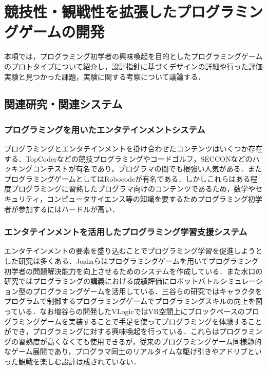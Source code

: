 \section{競技性・観戦性を拡張したプログラミングゲームの開発}
本項では，プログラミング初学者の興味喚起を目的としたプログラミングゲームのプロトタイプについて紹介し，設計指針に基づくデザインの詳細や行った評価実験と見つかった課題，実験に関する考察について議論する．

\subsection{関連研究・関連システム}

\subsubsection{プログラミングを用いたエンタテインメントシステム}
プログラミングとエンタテインメントを掛け合わせたコンテンツはいくつか存在する．TopCoder\cite{topcoder}などの競技プログラミングやコードゴルフ\cite{codegolf}，SECCON\cite{seccon}などのハッキングコンテストが有名であり，プログラマの間でも根強い人気がある．またプログラミングゲームとしてはRobocode\cite{robocode}が有名である．しかしこれらはある程度プログラミングに習熟したプログラマ向けのコンテンツであるため，数学やセキュリティ，コンピュータサイエンス等の知識を要するためプログラミング初学者が参加するにはハードルが高い．

\subsubsection{エンタテインメントを活用したプログラミング学習支援システム}
エンタテインメントの要素を盛り込むことでプログラミング学習を促進しようとした研究は多くある．Joshaらはプログラミングゲームを用いてプログラミング初学者の問題解決能力を向上させるためのシステムを作成している\cite{joshua}．また水口の研究ではプログラミングの講義における成績評価にロボットバトルシミュレーション型のプログラミングゲームを活用している\cite{minakuchi}．三谷らの研究ではキャラクタをプログラムで制御するプログラミングゲームでプログラミングスキルの向上を図っている\cite{mitani}．なお増谷らの開発したVLogic\cite{mashitani}ではVR空間上にブロックベースのプログラミングゲームを実装することで手足を使ってプログラミングを体験することができ，プログラミングに対する興味喚起を行っている．これらはプログラミングの習熟度が高くなくても使用できるが，従来のプログラミングゲーム同様静的なゲーム展開であり，プログラマ同士のリアルタイムな駆け引きやアドリブといった観戦を楽しむ設計は成されていない．

